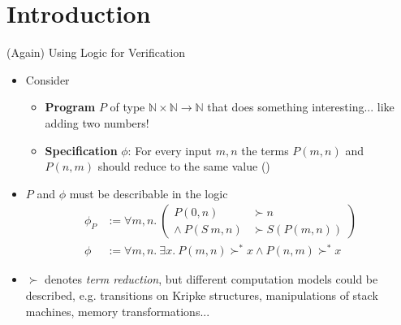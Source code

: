 
\section{Introduction}

\begin{frame}{(Again) Using Logic for Verification}
\begin{itemize}
	\item Consider
	\begin{itemize}
		\item \textbf{Program} $P$ of type $ℕ \times ℕ \rightarrow ℕ$ that does something interesting... like adding two numbers!
		\item \textbf{Specification} $\phi$: For every input $m, n$ the terms $P(m, n)$ and $P(n, m)$ should reduce to the same value ()
	\end{itemize}

	\pause

	\item $P$ and $\phi$ must be describable in the logic
	\begin{align*}
		\phi_P &:= ∀ m, n.~ \left(\begin{aligned}
			  P(0, n)   &\succ n\\
			∧~ P(S~m, n) &\succ S(P(m, n))
		\end{aligned}\right)\\[1em]
		\phi &:= ∀ m, n.~∃ x.~ P(m, n) \succ^{*} x ∧ P(n, m) \succ^* x
	\end{align*}

	\pause

	\item $\succ$ denotes \textit{term reduction}, but different computation models could be described, e.g. transitions on Kripke structures, manipulations of stack machines, memory transformations...

\end{itemize}
\end{frame}

